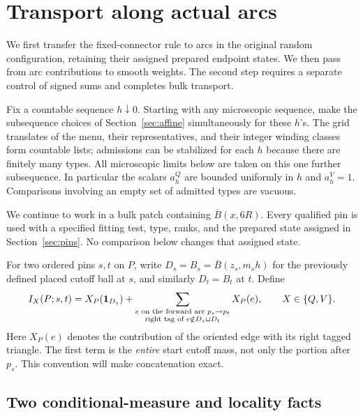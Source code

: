 \section{Transport along actual arcs}\label{sec:actual-arcs}

We first transfer the fixed-connector rule to arcs in the original random
configuration, retaining their assigned prepared endpoint states. We
then pass from arc contributions to smooth weights. The second step
requires a separate control of signed sums and completes bulk transport.

Fix a countable sequence $h\downarrow0$.  Starting with any microscopic
sequence, make the subsequence choices of Section~\ref{sec:affine}
simultaneously for these $h$'s.  The grid translates of the menu, their
representatives, and their integer winding classes form countable lists;
admissions can be stabilized for each $h$ because there are finitely many
types.  All microscopic limits below are taken on this one further
subsequence.  In particular the scalars $a_h^Q$ are bounded uniformly in
$h$ and $a_h^V=1$.  Comparisons involving an empty set of admitted types
are vacuous.

We continue to work in a bulk patch containing $\overline B(x,6R)$.
Every qualified pin is used with a specified fitting test, type, ranks,
and the prepared state assigned in Section~\ref{sec:pins}.  No
comparison below changes that assigned state.

For two ordered pins $s,t$ on $P$, write
$D_s=B_s=\overline B(z_s,m_sh)$ for the previously defined placed
cutoff ball at $s$, and similarly $D_t=B_t$ at $t$. Define
\[
 I_X(P;s,t)
   =X_P(\mathbf 1_{D_s})
     +\sum_{\substack{e\text{ on the forward arc }p_s\to p_t\\
               \text{right tag of }e\notin D_s\cup D_t}}
                   X_P(e),\qquad X\in\{Q,V\}.
\]
Here $X_P(e)$ denotes the contribution of the oriented edge with its
right tagged triangle.  The first term is the \emph{entire} start
cutoff mass, not only the portion after $p_s$.  This convention will
make concatenation exact.

\subsection{Two conditional-measure and locality facts}

